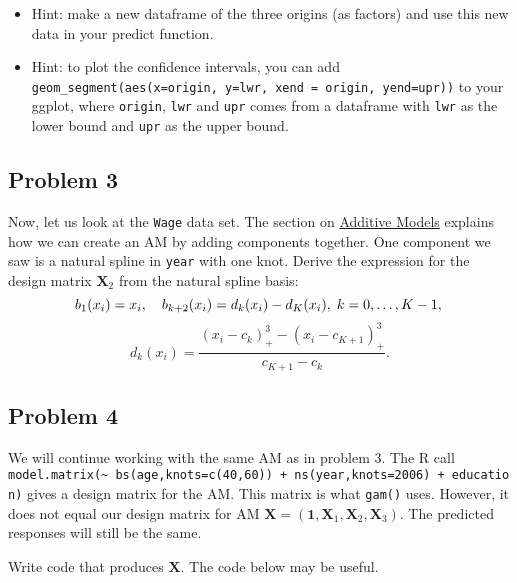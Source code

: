 \documentclass[]{article}
\begin{document}
\begin{itemize}
\item
  Hint: make a new dataframe of the three origins (as factors) and use
  this new data in your predict function.
\item
  Hint: to plot the confidence intervals, you can add
  \texttt{geom\_segment(aes(x=origin,\ y=lwr,\ xend\ =\ origin,\ yend=upr))}
  to your ggplot, where \texttt{origin}, \texttt{lwr} and \texttt{upr}
  comes from a dataframe with \texttt{lwr} as the lower bound and
  \texttt{upr} as the upper bound.
\end{itemize}

\subsection{Problem 3}\label{problem-3}

Now, let us look at the \texttt{Wage} data set. The section on
\href{https://htmlpreview.github.io/?https://github.com/stefaniemuff/statlearning/blob/master/7BeyondLinear/7BeyondLinear.html}{Additive
Models} explains how we can create an AM by adding components together.
One component we saw is a natural spline in \texttt{year} with one knot.
Derive the expression for the design matrix \(\mathbf X_2\) from the
natural spline basis: \[
b_1(x_i) = x_i, \quad b_{k+2}(x_i) = d_k(x_i)-d_K(x_i),\; k = 0, \ldots, K - 1,\\
\] \[
d_k(x_i) = \frac{(x_i-c_k)^3_+-(x_i-c_{K+1})^3_+}{c_{K+1}-c_k}.
\]

\subsection{Problem 4}\label{problem-4}

We will continue working with the same AM as in problem 3. The R call
\texttt{model.matrix(\textasciitilde{}\ bs(age,knots=c(40,60))\ +\ ns(year,knots=2006)\ +\ education)}
gives a design matrix for the AM. This matrix is what \texttt{gam()}
uses. However, it does not equal our design matrix for AM
\(\mathbf X = (\mathbf{1}, \mathbf{X}_1, \mathbf{X}_2, \mathbf{X}_3)\).
The predicted responses will still be the same.

Write code that produces \(\mathbf X\). The code below may be useful.
\end{document}
